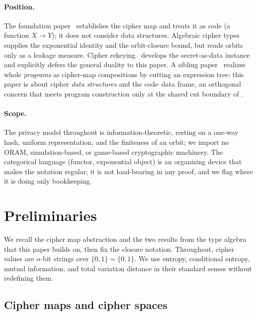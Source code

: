 \documentclass[11pt]{article}
\theoremstyle{definition}
\theoremstyle{plain}
\theoremstyle{definition}
\theoremstyle{remark}
\newcommand{\B}{\{0,1\}}
\begin{document}
\paragraph{Position.} The foundation
paper~\cite{towell2026cipher} establishes the cipher map and treats it
as code (a function $X \to Y$); it does not consider data structures.
Algebraic cipher types~\cite{towell2026algebraic} supplies the
exponential identity and the orbit-closure bound, but reads orbits only
as a leakage measure. Cipher rekeying~\cite{towell2026rekeying}
develops the secret-as-data instance and explicitly defers the
general duality to this paper. A sibling
paper~\cite{towell2026cipherprog} realizes whole \emph{programs} as
cipher-map compositions by cutting an expression tree; this paper is
about cipher \emph{data structures} and the code--data frame, an
orthogonal concern that meets program construction only at the shared
cut boundary of .

\paragraph{Scope.} The privacy model throughout is
information-theoretic, resting on a one-way hash, uniform
representation, and the finiteness of an orbit; we import no
ORAM, simulation-based, or game-based cryptographic machinery. The
categorical language (functor, exponential object) is an organizing
device that makes the notation regular; it is not load-bearing in any
proof, and we flag where it is doing only bookkeeping.

\section{Preliminaries}
\label{sec:prelim}

We recall the cipher map abstraction and the two results from the
type algebra that this paper builds on, then fix the closure notation.
Throughout, cipher values are $n$-bit strings over $\B = \{0,1\}$. We
use entropy, conditional entropy, mutual information, and total
variation distance in their standard senses without redefining them.

\subsection{Cipher maps and cipher spaces}
\end{document}
